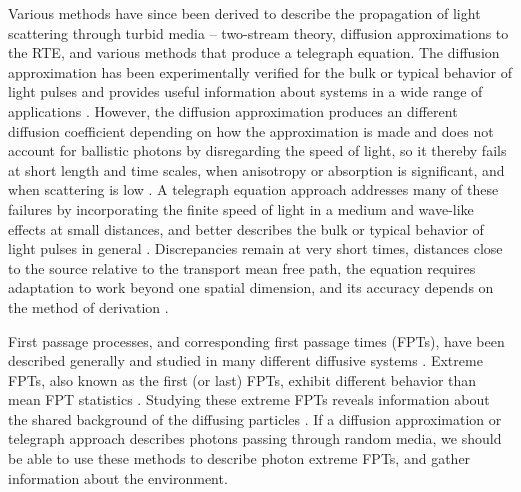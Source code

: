 \documentclass[9pt,twocolumn,twoside]{opticajnl}
\begin{document}
Various methods have since been derived to describe the propagation of light scattering through turbid media -- two-stream theory, diffusion approximations to the RTE, and various methods that produce a telegraph equation. The diffusion approximation has been experimentally verified for the bulk or typical behavior of light pulses and provides useful information about systems in a wide range of applications \cite{haskell_boundary_1994,allgaier_diffuse_2021, brown_light_1975, collis_lidar_1966,graaff_diffusion_2000, loumaigne_intrinsic_2015, aleandri_dynamic_2018, taitelbaum_diagnosis_1999,chandrasekhar_stochastic_1943,chandrasekhar_radiative_1950}. However, the diffusion approximation produces an different diffusion coefficient depending on how the approximation is made and does not account for ballistic photons by disregarding the speed of light, so it thereby fails at short length and time scales, when anisotropy or absorption is significant, and when scattering is low \cite{ishimaru_wave_nodate,yoo_time-resolved_1990, yoo_when_1990, durian_photon_1997, elaloufi_definition_2003, elaloufi_time-dependent_2002,zhang_wave_2002,graaff_diffusion_2000,pierrat_photon_2006}. A telegraph equation approach addresses many of these failures by incorporating the finite speed of light in a medium and wave-like effects at small distances, and better describes the bulk or typical behavior of light pulses in general \cite{goldstein_diffusion_1951,durian_two-stream_1996,masoliver_solutions_1992,masoliver_finite-velocity_1996,durian_photon_1997,lemieux_diffusing-light_1998, das_non-fickian_1998,weiss_applications_2002,hoenders_telegraphers_2005,polishchuk_photon-density_1997}. Discrepancies remain at very short times, distances close to the source relative to the transport mean free path, the equation requires adaptation to work beyond one spatial dimension, and its accuracy depends on the method of derivation \cite{durian_photon_1997, dudko_photon_2005, lemieux_diffusing-light_1998, heizler_asymptotic_2012,hoenders_telegraphers_2005,polishchuk_photon-density_1997}.

First passage processes, and corresponding first passage times (FPTs), have been described generally and studied in many different diffusive systems \cite{redner_8_2001,weiss_order_1983,weiss_first_1984,weiss_applications_2002,godec_first_2016,grebenkov_escape_2017,grebenkov_molecular_2021,condamin_first-passage_2005,condamin_first-passage_2007,polizzi_mean_2016,chun_heterogeneous_2023,koren_leapover_2007,noskowicz_average_1988,benichou_zero_2008}. Extreme FPTs, also known as the first (or last) FPTs, exhibit different behavior than mean FPT statistics \cite{linn_extreme_2022,madrid_competition_2020,lawley_distribution_2020,lawley_probabilistic_2020,lawley_slowest_2023,lawley_universal_2020}. Studying these extreme FPTs reveals information about the shared background of the diffusing particles \cite{hass_anomalous_2023,hass_first-passage_2024}. If a diffusion approximation or telegraph approach describes photons passing through random media, we should be able to use these methods to describe photon extreme FPTs, and gather information about the environment.
\end{document}
